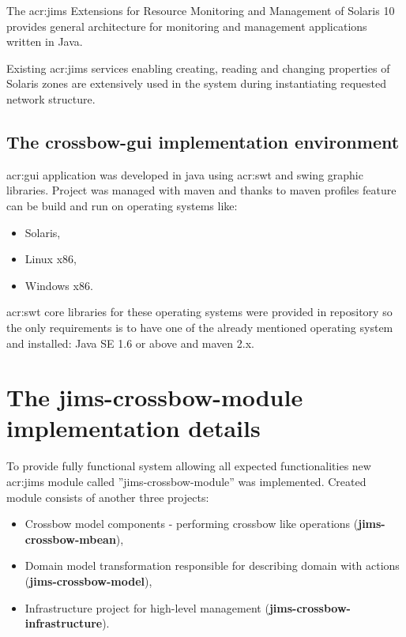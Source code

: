 \documentclass[11pt,openany]{book}
\begin{document}
      The \gls{acr:jims} Extensions for Resource Monitoring and Management of Solaris 10 provides general architecture for
      monitoring and management applications written in Java.
	 
      Existing \gls{acr:jims} services enabling creating, reading and changing properties of Solaris zones are
      extensively used in the system during instantiating requested network structure.
    
     \subsection{The crossbow-gui implementation environment}

      \gls{acr:gui} application was developed in java using \gls{acr:swt} and swing graphic libraries. Project was managed with
      maven and thanks to maven profiles feature can be build and run on operating systems like:

      \begin{itemize}
        \item Solaris,
        \item Linux x86,
        \item Windows x86.
      \end{itemize}

      \gls{acr:swt} core libraries for these operating systems were provided in repository so the only requirements is to have
      one of the already mentioned operating system and installed: Java SE 1.6 or above and maven 2.x.
	  
	  \medskip
	  

      \section{The jims-crossbow-module implementation details}
	\label{sec:impl:module}
		
      To provide fully functional system allowing all expected functionalities new \gls{acr:jims} module called ''jims-crossbow-module'' was
      implemented. Created module consists of another three projects:

      \begin{itemize}
        \item Crossbow model components - performing crossbow like operations (\textbf{jims-crossbow-mbean}),
        \item Domain model transformation responsible for describing domain with actions (\textbf{jims-crossbow-model}),
        \item Infrastructure project for high-level management (\textbf{jims-crossbow-infrastructure}).
      \end{itemize}
\end{document}
